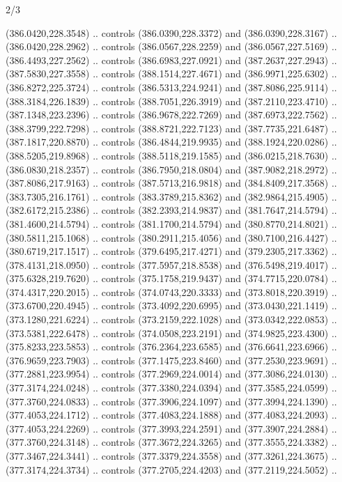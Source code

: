 \begin{flagdescription}{2/3}
\begin{scope}[xshift=0.5\flaglength,yshift=0.5\flagwidth,scale=\flagwidth/495.65]
\begin{scope}[y=0.8pt, x=0.8pt, yscale=-1,shift={(-463.76,-309.78)}]
  (386.0420,228.3548) .. controls (386.0390,228.3372) and (386.0390,228.3167) ..
  (386.0420,228.2962) .. controls (386.0567,228.2259) and (386.0567,227.5169) ..
  (386.4493,227.2562) .. controls (386.6983,227.0921) and (387.2637,227.2943) ..
  (387.5830,227.3558) .. controls (388.1514,227.4671) and (386.9971,225.6302) ..
  (386.8272,225.3724) .. controls (386.5313,224.9241) and (387.8086,225.9114) ..
  (388.3184,226.1839) .. controls (388.7051,226.3919) and (387.2110,223.4710) ..
  (387.1348,223.2396) .. controls (386.9678,222.7269) and (387.6973,222.7562) ..
  (388.3799,222.7298) .. controls (388.8721,222.7123) and (387.7735,221.6487) ..
  (387.1817,220.8870) .. controls (386.4844,219.9935) and (388.1924,220.0286) ..
  (388.5205,219.8968) .. controls (388.5118,219.1585) and (386.0215,218.7630) ..
  (386.0830,218.2357) .. controls (386.7950,218.0804) and (387.9082,218.2972) ..
  (387.8086,217.9163) .. controls (387.5713,216.9818) and (384.8409,217.3568) ..
  (383.7305,216.1761) .. controls (383.3789,215.8362) and (382.9864,215.4905) ..
  (382.6172,215.2386) .. controls (382.2393,214.9837) and (381.7647,214.5794) ..
  (381.4600,214.5794) .. controls (381.1700,214.5794) and (380.8770,214.8021) ..
  (380.5811,215.1068) .. controls (380.2911,215.4056) and (380.7100,216.4427) ..
  (380.6719,217.1517) .. controls (379.6495,217.4271) and (379.2305,217.3362) ..
  (378.4131,218.0950) .. controls (377.5957,218.8538) and (376.5498,219.4017) ..
  (375.6328,219.7620) .. controls (375.1758,219.9437) and (374.7715,220.0784) ..
  (374.4317,220.2015) .. controls (374.0743,220.3333) and (373.8018,220.3919) ..
  (373.6700,220.4945) .. controls (373.4092,220.6995) and (373.0430,221.1419) ..
  (373.1280,221.6224) .. controls (373.2159,222.1028) and (373.0342,222.0853) ..
  (373.5381,222.6478) .. controls (374.0508,223.2191) and (374.9825,223.4300) ..
  (375.8233,223.5853) .. controls (376.2364,223.6585) and (376.6641,223.6966) ..
  (376.9659,223.7903) .. controls (377.1475,223.8460) and (377.2530,223.9691) ..
  (377.2881,223.9954) .. controls (377.2969,224.0014) and (377.3086,224.0130) ..
  (377.3174,224.0248) .. controls (377.3380,224.0394) and (377.3585,224.0599) ..
  (377.3760,224.0833) .. controls (377.3906,224.1097) and (377.3994,224.1390) ..
  (377.4053,224.1712) .. controls (377.4083,224.1888) and (377.4083,224.2093) ..
  (377.4053,224.2269) .. controls (377.3993,224.2591) and (377.3907,224.2884) ..
  (377.3760,224.3148) .. controls (377.3672,224.3265) and (377.3555,224.3382) ..
  (377.3467,224.3441) .. controls (377.3379,224.3558) and (377.3261,224.3675) ..
  (377.3174,224.3734) .. controls (377.2705,224.4203) and (377.2119,224.5052) ..

\end{scope}
\end{scope}
\end{flagdescription}
